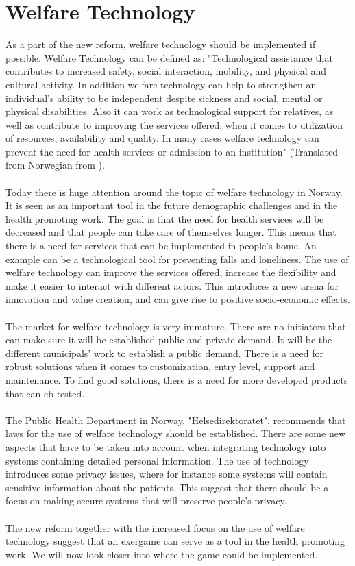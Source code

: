 \section{Welfare Technology}
As a part of the new reform, welfare technology should be implemented if possible. Welfare Technology can be defined as: "Technological assistance that contributes to increased safety, social interaction, mobility, and physical and cultural activity. In addition welfare technology can help to strengthen an individual’s ability to be independent despite sickness and social, mental or physical disabilities. Also it can work as technological support for relatives, as well as contribute to improving the services offered, when it comes to utilization of resources, availability and quality. In many cases welfare technology can prevent the need for health services or admission to an institution" (Translated from Norwegian from \cite{welfare}).\\ \\
Today there is huge attention around the topic of welfare technology in Norway. It is seen as an important tool in the future demographic challenges and in the health promoting work.  The goal is that the need for health services will be decreased and that people can take care of themselves longer. This means that there is a need for services that can be implemented in people’s home. An example can be a technological tool for preventing falls and loneliness.  The use of welfare technology can improve the services offered, increase the flexibility and make it easier to interact with different actors. This introduces a new arena for innovation and value creation, and can give rise to positive socio-economic effects. \\ \\
The market for welfare technology is very immature. There are no initiators that can make sure it will be established public and private demand. It will be the different municipals' work to establish a public demand. There is a need for robust solutions when it comes to customization, entry level, support and maintenance. To find good solutions, there is a need for more developed products that can eb tested.\cite{welfare} \\ \\
The Public Health Department in Norway, "Helsedirektoratet", recommends that laws for the use of welfare technology should be established. There are some new aspects that have to be taken into account when integrating technology into systems containing detailed personal information. The use of technology introduces some privacy issues, where for instance some systems will contain  sensitive information about the patients. This suggest that there should be a focus on making secure systems that will preserve people’s privacy.\cite{welfare} \\ \\
The new reform together with the increased focus on the use of welfare technology suggest that an exergame can serve as a tool in the health promoting work. We will now look closer into where the game could be implemented.

